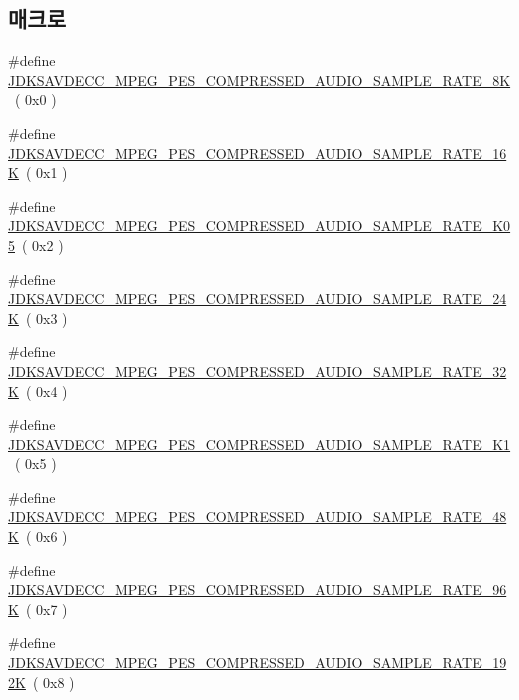 \subsection*{매크로}
\begin{DoxyCompactItemize}
\item 
\#define \hyperlink{group__mpeg__pes__compressed__audio__sample__rate_gaebafd1dc7dfb6f0564126e3ac6f6b11d}{J\+D\+K\+S\+A\+V\+D\+E\+C\+C\+\_\+\+M\+P\+E\+G\+\_\+\+P\+E\+S\+\_\+\+C\+O\+M\+P\+R\+E\+S\+S\+E\+D\+\_\+\+A\+U\+D\+I\+O\+\_\+\+S\+A\+M\+P\+L\+E\+\_\+\+R\+A\+T\+E\+\_\+8K}~( 0x0 )
\item 
\#define \hyperlink{group__mpeg__pes__compressed__audio__sample__rate_ga3c56955464e9fe5f1f6682ff08fa5aef}{J\+D\+K\+S\+A\+V\+D\+E\+C\+C\+\_\+\+M\+P\+E\+G\+\_\+\+P\+E\+S\+\_\+\+C\+O\+M\+P\+R\+E\+S\+S\+E\+D\+\_\+\+A\+U\+D\+I\+O\+\_\+\+S\+A\+M\+P\+L\+E\+\_\+\+R\+A\+T\+E\+\_\+16K}~( 0x1 )
\item 
\#define \hyperlink{group__mpeg__pes__compressed__audio__sample__rate_ga1c10355dff452f4a6133186edb073673}{J\+D\+K\+S\+A\+V\+D\+E\+C\+C\+\_\+\+M\+P\+E\+G\+\_\+\+P\+E\+S\+\_\+\+C\+O\+M\+P\+R\+E\+S\+S\+E\+D\+\_\+\+A\+U\+D\+I\+O\+\_\+\+S\+A\+M\+P\+L\+E\+\_\+\+R\+A\+T\+E\+\_\+K05}~( 0x2 )
\item 
\#define \hyperlink{group__mpeg__pes__compressed__audio__sample__rate_ga18de6af46aad4d685b488fb1f9d72834}{J\+D\+K\+S\+A\+V\+D\+E\+C\+C\+\_\+\+M\+P\+E\+G\+\_\+\+P\+E\+S\+\_\+\+C\+O\+M\+P\+R\+E\+S\+S\+E\+D\+\_\+\+A\+U\+D\+I\+O\+\_\+\+S\+A\+M\+P\+L\+E\+\_\+\+R\+A\+T\+E\+\_\+24K}~( 0x3 )
\item 
\#define \hyperlink{group__mpeg__pes__compressed__audio__sample__rate_ga2a9597e35fc0b865b54855c9c88e4189}{J\+D\+K\+S\+A\+V\+D\+E\+C\+C\+\_\+\+M\+P\+E\+G\+\_\+\+P\+E\+S\+\_\+\+C\+O\+M\+P\+R\+E\+S\+S\+E\+D\+\_\+\+A\+U\+D\+I\+O\+\_\+\+S\+A\+M\+P\+L\+E\+\_\+\+R\+A\+T\+E\+\_\+32K}~( 0x4 )
\item 
\#define \hyperlink{group__mpeg__pes__compressed__audio__sample__rate_ga28d3644123f83f06fb879fa07b179ed1}{J\+D\+K\+S\+A\+V\+D\+E\+C\+C\+\_\+\+M\+P\+E\+G\+\_\+\+P\+E\+S\+\_\+\+C\+O\+M\+P\+R\+E\+S\+S\+E\+D\+\_\+\+A\+U\+D\+I\+O\+\_\+\+S\+A\+M\+P\+L\+E\+\_\+\+R\+A\+T\+E\+\_\+K1}~( 0x5 )
\item 
\#define \hyperlink{group__mpeg__pes__compressed__audio__sample__rate_ga4f2265d18f3a3d2986af6cab9ce29025}{J\+D\+K\+S\+A\+V\+D\+E\+C\+C\+\_\+\+M\+P\+E\+G\+\_\+\+P\+E\+S\+\_\+\+C\+O\+M\+P\+R\+E\+S\+S\+E\+D\+\_\+\+A\+U\+D\+I\+O\+\_\+\+S\+A\+M\+P\+L\+E\+\_\+\+R\+A\+T\+E\+\_\+48K}~( 0x6 )
\item 
\#define \hyperlink{group__mpeg__pes__compressed__audio__sample__rate_gab7cbc66c81966afb4fb2c596988ded4b}{J\+D\+K\+S\+A\+V\+D\+E\+C\+C\+\_\+\+M\+P\+E\+G\+\_\+\+P\+E\+S\+\_\+\+C\+O\+M\+P\+R\+E\+S\+S\+E\+D\+\_\+\+A\+U\+D\+I\+O\+\_\+\+S\+A\+M\+P\+L\+E\+\_\+\+R\+A\+T\+E\+\_\+96K}~( 0x7 )
\item 
\#define \hyperlink{group__mpeg__pes__compressed__audio__sample__rate_ga73c2e98a62edb3dd66629019ab6a7ab2}{J\+D\+K\+S\+A\+V\+D\+E\+C\+C\+\_\+\+M\+P\+E\+G\+\_\+\+P\+E\+S\+\_\+\+C\+O\+M\+P\+R\+E\+S\+S\+E\+D\+\_\+\+A\+U\+D\+I\+O\+\_\+\+S\+A\+M\+P\+L\+E\+\_\+\+R\+A\+T\+E\+\_\+192K}~( 0x8 )
\end{DoxyCompactItemize}


